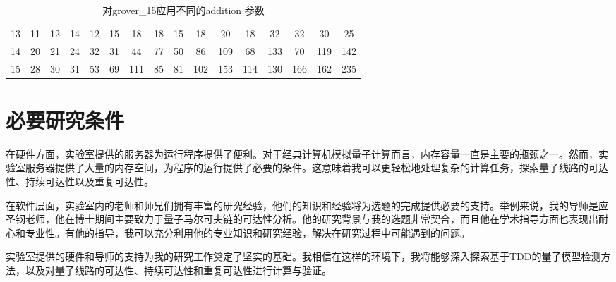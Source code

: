 \begin{table}[!htbp]
\begin{tabular}{c|ccccccccccccccc}
    \rowcolor[HTML]{8DB4E2} 
    \cellcolor[HTML]{FFFFFF}13 & 11                                               & 12                          & 14                          & 12                          & 15                          & 18                                               & 18                         & 15                          & 18                          & 20                          & 18                          & 32                          & 32                          & 30                          & 25                          \\
    \rowcolor[HTML]{8DB4E2} 
    \cellcolor[HTML]{FFFFFF}14 & 20                                               & 21                          & 24                          & 32                          & 31                          & 44                                               & 77                         & 50                          & 86                          & \cellcolor[HTML]{538DD5}109 & 68                          & \cellcolor[HTML]{538DD5}133 & 70                          & \cellcolor[HTML]{538DD5}119 & \cellcolor[HTML]{538DD5}142 \\
    \rowcolor[HTML]{538DD5} 
    \cellcolor[HTML]{FFFFFF}15 & \cellcolor[HTML]{8DB4E2}28                       & \cellcolor[HTML]{8DB4E2}30  & \cellcolor[HTML]{8DB4E2}31  & \cellcolor[HTML]{8DB4E2}53  & \cellcolor[HTML]{8DB4E2}69  & 111                                              & \cellcolor[HTML]{8DB4E2}85 & \cellcolor[HTML]{8DB4E2}81  & 102                         & 153                         & 114                         & 130                         & 166                         & 162                         & 235                        
                     
    \end{tabular}
    \caption{对grover\_15应用不同的addition 参数}%
    \label{table:addition}
\end{table}
\section{必要研究条件}
在硬件方面，实验室提供的服务器为运行程序提供了便利。对于经典计算机模拟量子计算而言，内存容量一直是主要的瓶颈之一。然而，实验室服务器提供了大量的内存空间，为程序的运行提供了必要的条件。这意味着我可以更轻松地处理复杂的计算任务，探索量子线路的可达性、持续可达性以及重复可达性。

在软件层面，实验室内的老师和师兄们拥有丰富的研究经验，他们的知识和经验将为选题的完成提供必要的支持。举例来说，我的导师是应圣钢老师，他在博士期间主要致力于量子马尔可夫链的可达性分析。他的研究背景与我的选题非常契合，而且他在学术指导方面也表现出耐心和专业性。有他的指导，我可以充分利用他的专业知识和研究经验，解决在研究过程中可能遇到的问题。

实验室提供的硬件和导师的支持为我的研究工作奠定了坚实的基础。我相信在这样的环境下，我将能够深入探索基于TDD的量子模型检测方法，以及对量子线路的可达性、持续可达性和重复可达性进行计算与验证。
